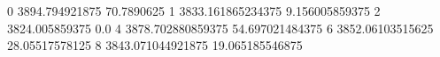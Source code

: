 0 3894.794921875 70.7890625
1 3833.161865234375 9.156005859375
2 3824.005859375 0.0
4 3878.702880859375 54.697021484375
6 3852.06103515625 28.05517578125
8 3843.071044921875 19.065185546875
